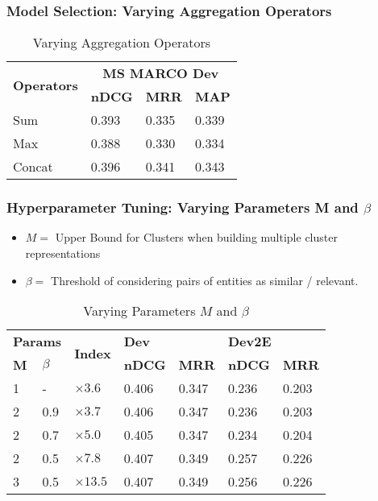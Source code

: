 \documentclass{beamer}
\begin{document}
\begin{frame}
  \frametitle{Model Selection: Varying Aggregation Operators}
  
  \begin{table}[ht]
  \centering
  \caption{Varying Aggregation Operators}
  \begin{tabular}{llll}
  \hline
  \multirow{2}{*}{\textbf{Operators}} & \multicolumn{3}{c}{\textbf{MS MARCO Dev}}   \\
                                    & \textbf{nDCG} & \textbf{MRR} & \textbf{MAP} \\
  \hline
  Sum & 0.393 & 0.335 & 0.339 \\
  Max & 0.388 & 0.330 & 0.334 \\
  Concat & 0.396 & 0.341 & 0.343 \\
  \hline
  \end{tabular}
  \end{table}
  
  \end{frame}
  
\begin{frame}
\frametitle{Hyperparameter Tuning: Varying Parameters M and $\beta$}
\begin{itemize}
  \item $M =$ Upper Bound for Clusters when building multiple cluster representations
  \item $\beta =$ Threshold of considering pairs of entities as similar / relevant.
\end{itemize}
\begin{table}[ht]
\centering
\caption{Varying Parameters $M$ and $\beta$}
\begin{tabular}{lllllll}
  \multicolumn{2}{l}{\textbf{Params}} & \multirow{2}{*}{\textbf{Index}} & \multicolumn{2}{l}{\textbf{Dev}} & \multicolumn{2}{l}{\textbf{Dev2E}} \\
\textbf{M}    & \textbf{$\beta$}    &                                 & \textbf{nDCG}   & \textbf{MRR}   & \textbf{nDCG}    & \textbf{MRR}    \\
  \hline
1 & - & $\times3.6$ & 0.406 & 0.347 & 0.236 & 0.203 \\
2 & 0.9 & $\times3.7$ & 0.406 & 0.347 & 0.236 & 0.203 \\
2 & 0.7 & $\times5.0$ & 0.405 & 0.347 & 0.234 & 0.204 \\
2 & 0.5 & $\times7.8$ & 0.407 & 0.349 & 0.257 & 0.226 \\
3 & 0.5 & $\times13.5$ & 0.407 & 0.349 & 0.256 & 0.226 \\
\hline
\end{tabular}
\end{table}

\end{frame}
  
\end{document}
